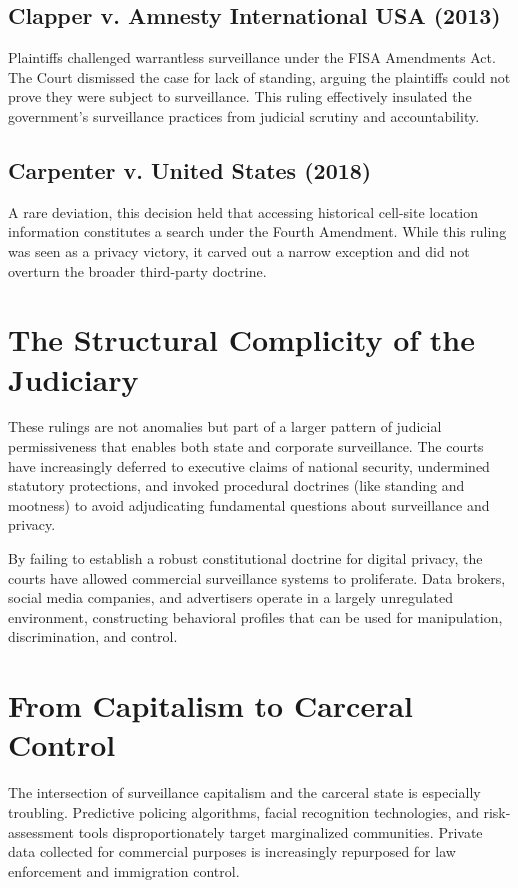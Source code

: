 \subsection*{Clapper v. Amnesty International USA (2013)}
Plaintiffs challenged warrantless surveillance under the FISA Amendments Act. The Court dismissed the case for lack of standing, arguing the plaintiffs could not prove they were subject to surveillance. This ruling effectively insulated the government’s surveillance practices from judicial scrutiny and accountability.

\subsection*{Carpenter v. United States (2018)}
A rare deviation, this decision held that accessing historical cell-site location information constitutes a search under the Fourth Amendment. While this ruling was seen as a privacy victory, it carved out a narrow exception and did not overturn the broader third-party doctrine.

\section{The Structural Complicity of the Judiciary}
These rulings are not anomalies but part of a larger pattern of judicial permissiveness that enables both state and corporate surveillance. The courts have increasingly deferred to executive claims of national security, undermined statutory protections, and invoked procedural doctrines (like standing and mootness) to avoid adjudicating fundamental questions about surveillance and privacy.

By failing to establish a robust constitutional doctrine for digital privacy, the courts have allowed commercial surveillance systems to proliferate. Data brokers, social media companies, and advertisers operate in a largely unregulated environment, constructing behavioral profiles that can be used for manipulation, discrimination, and control.

\section{From Capitalism to Carceral Control}
The intersection of surveillance capitalism and the carceral state is especially troubling. Predictive policing algorithms, facial recognition technologies, and risk-assessment tools disproportionately target marginalized communities. Private data collected for commercial purposes is increasingly repurposed for law enforcement and immigration control.

